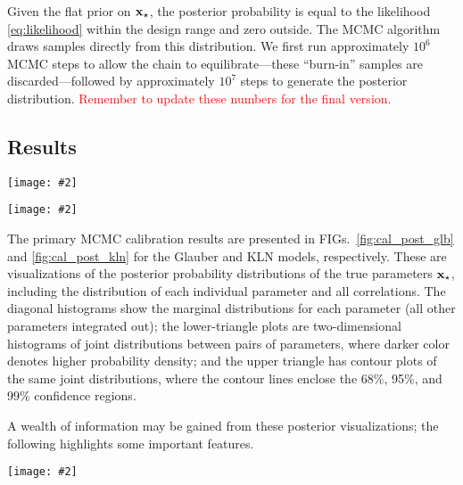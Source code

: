 \documentclass[aps,prc,reprint,superscriptaddress,amsmath]{revtex4-1}
\newcommand{\todo}[1]{\textcolor{red}{#1}}
\newcommand{\widefig}[3][t]{
  \begin{figure*}[#1]
    \texttt{[image: \#2]}
    \caption{\label{fig:#2}#3}
  \end{figure*}
}
\begin{document}
Given the flat prior on $\mathbf x_\star$, the posterior probability is equal to the likelihood \eqref{eq:likelihood} within the design range and zero outside.
The MCMC algorithm draws samples directly from this distribution.
We first run approximately $10^6$ MCMC steps to allow the chain to equilibrate---these ``burn-in'' samples are discarded---followed by approximately $10^7$ steps to generate the posterior distribution.
\todo{Remember to update these numbers for the final version.}

\subsection{Results}

\widefig{cal_post_glb}{
  Posterior marginal and joint distributions of the calibration parameters for the Glauber model.
  On the diagonal are histograms of MCMC samples for the respective parameters,
  on the lower triangle are two-dimensional histograms of MCMC samples showing the correlation between pairs of parameters,
  and on the upper triangle are approximate contours for 68\%, 95\%, and 99\% confidence regions along with a dot indicating the median.
}

\widefig{cal_post_kln}{
  Same as FIG.~\ref{fig:cal_post_glb} for the KLN model.
}

The primary MCMC calibration results are presented in FIGs.~\ref{fig:cal_post_glb} and \ref{fig:cal_post_kln} for the Glauber and KLN models, respectively.
These are visualizations of the posterior probability distributions of the true parameters $\mathbf x_\star$, including the distribution of each individual parameter and all correlations.
The diagonal histograms show the marginal distributions for each parameter (all other parameters integrated out);
the lower-triangle plots are two-dimensional histograms of joint distributions between pairs of parameters, where darker color denotes higher probability density;
and the upper triangle has contour plots of the same joint distributions, where the contour lines enclose the 68\%, 95\%, and 99\% confidence regions.

A wealth of information may be gained from these posterior visualizations; the following highlights some important features.

\widefig{post_draws}{
  Random realizations of the calibrated posterior for Glauber (top, blue) and KLN (bottom, green) initial conditions.
  Similar to FIG.~\ref{fig:prior_draws},
  except the lines are posterior emulator predictions instead of explicit prior calculations.
}
\end{document}
